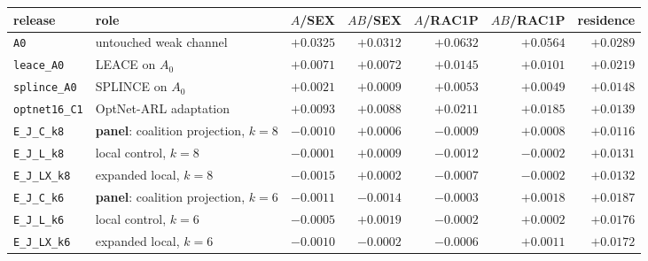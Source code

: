 \begin{tabular}{@{}l l r r r r r@{}}
\toprule
release & role & $A$/SEX & $AB$/SEX & $A$/RAC1P & $AB$/RAC1P & residence \\
\midrule
\texttt{A0} & untouched weak channel & $+0.0325$ & $+0.0312$ & $+0.0632$ & $+0.0564$ & $+0.0289$ \\
\texttt{leace\_A0} & LEACE on $A_0$ & $+0.0071$ & $+0.0072$ & $+0.0145$ & $+0.0101$ & $+0.0219$ \\
\texttt{splince\_A0} & SPLINCE on $A_0$ & $+0.0021$ & $+0.0009$ & $+0.0053$ & $+0.0049$ & $+0.0148$ \\
\texttt{optnet16\_C1} & OptNet-ARL adaptation & $+0.0093$ & $+0.0088$ & $+0.0211$ & $+0.0185$ & $+0.0139$ \\
\midrule
\texttt{E\_J\_C\_k8} & \textbf{panel}: coalition projection, $k{=}8$ & $-0.0010$ & $+0.0006$ & $-0.0009$ & $+0.0008$ & $+0.0116$ \\
\texttt{E\_J\_L\_k8} & local control, $k{=}8$ & $-0.0001$ & $+0.0009$ & $-0.0012$ & $-0.0002$ & $+0.0131$ \\
\texttt{E\_J\_LX\_k8} & expanded local, $k{=}8$ & $-0.0015$ & $+0.0002$ & $-0.0007$ & $-0.0002$ & $+0.0132$ \\
\texttt{E\_J\_C\_k6} & \textbf{panel}: coalition projection, $k{=}6$ & $-0.0011$ & $-0.0014$ & $-0.0003$ & $+0.0018$ & $+0.0187$ \\
\texttt{E\_J\_L\_k6} & local control, $k{=}6$ & $-0.0005$ & $+0.0019$ & $-0.0002$ & $+0.0002$ & $+0.0176$ \\
\texttt{E\_J\_LX\_k6} & expanded local, $k{=}6$ & $-0.0010$ & $-0.0002$ & $-0.0006$ & $+0.0011$ & $+0.0172$ \\
\midrule
\bottomrule
\end{tabular}
